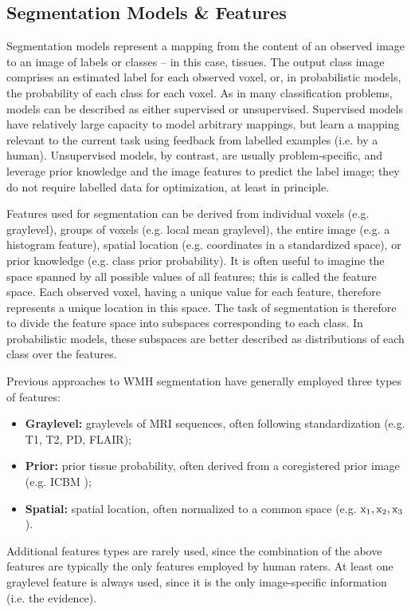 \subsection{Segmentation Models \& Features}
Segmentation models represent a mapping from the content of an observed image to an image of labels or classes -- in this case, tissues. The output class image comprises an estimated label for each observed voxel, or, in probabilistic models, the probability of each class for each voxel. As in many classification problems, models can be described as either supervised or unsupervised. Supervised models have relatively large capacity to model arbitrary mappings, but learn a mapping relevant to the current task using feedback from labelled examples (i.e. by a human). Unsupervised models, by contrast, are usually problem-specific, and leverage prior knowledge and the image features to predict the label image; they do not require labelled data for optimization, at least in principle. 
\par
Features used for segmentation can be derived from individual voxels (e.g. graylevel), groups of voxels (e.g. local mean graylevel), the entire image (e.g. a histogram feature), spatial location (e.g. coordinates in a standardized space), or prior knowledge (e.g. class prior probability). It is often useful to imagine the space spanned by all possible values of all features; this is called the feature space. Each observed voxel, having a unique value for each feature, therefore represents a unique location in this space. The task of segmentation is therefore to divide the feature space into subspaces corresponding to each class. In probabilistic models, these subspaces are better described as distributions of each class over the features.
\par
Previous approaches to WMH segmentation have generally employed three types of features:
\begin{itemize}
  \item \textbf{Graylevel:} graylevels of MRI sequences, often following standardization (e.g. T1, T2, PD, FLAIR);
  \item \textbf{Prior:} prior tissue probability, often derived from a coregistered prior image (e.g. ICBM \cite{Mazziotta2001});
  \item \textbf{Spatial:} spatial location, often normalized to a common space (e.g. $\mathrm{x}_1,\mathrm{x}_2,\mathrm{x}_3$).
\end{itemize}
Additional features types are rarely used, since the combination of the above features are typically the only features employed by human raters. At least one graylevel feature is always used, since it is the only image-specific information (i.e. the evidence).
